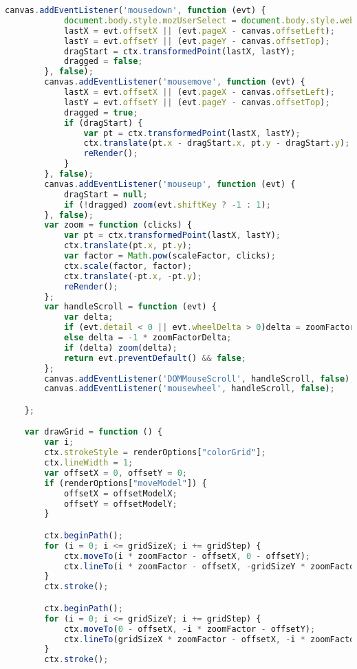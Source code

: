 \begin{lstlisting}[language=JavaScript, label={lst:renderFactory}, caption=When render frames are requested this file compiles the lines of gcode from the worker and sets up the rest of the canvas frames.]
        canvas.addEventListener('mousedown', function (evt) {
            document.body.style.mozUserSelect = document.body.style.webkitUserSelect = document.body.style.userSelect = 'none';
            lastX = evt.offsetX || (evt.pageX - canvas.offsetLeft);
            lastY = evt.offsetY || (evt.pageY - canvas.offsetTop);
            dragStart = ctx.transformedPoint(lastX, lastY);
            dragged = false;
        }, false);
        canvas.addEventListener('mousemove', function (evt) {
            lastX = evt.offsetX || (evt.pageX - canvas.offsetLeft);
            lastY = evt.offsetY || (evt.pageY - canvas.offsetTop);
            dragged = true;
            if (dragStart) {
                var pt = ctx.transformedPoint(lastX, lastY);
                ctx.translate(pt.x - dragStart.x, pt.y - dragStart.y);
                reRender();
            }
        }, false);
        canvas.addEventListener('mouseup', function (evt) {
            dragStart = null;
            if (!dragged) zoom(evt.shiftKey ? -1 : 1);
        }, false);
        var zoom = function (clicks) {
            var pt = ctx.transformedPoint(lastX, lastY);
            ctx.translate(pt.x, pt.y);
            var factor = Math.pow(scaleFactor, clicks);
            ctx.scale(factor, factor);
            ctx.translate(-pt.x, -pt.y);
            reRender();
        };
        var handleScroll = function (evt) {
            var delta;
            if (evt.detail < 0 || evt.wheelDelta > 0)delta = zoomFactorDelta;
            else delta = -1 * zoomFactorDelta;
            if (delta) zoom(delta);
            return evt.preventDefault() && false;
        };
        canvas.addEventListener('DOMMouseScroll', handleScroll, false);
        canvas.addEventListener('mousewheel', handleScroll, false);

    };

    var drawGrid = function () {
        var i;
        ctx.strokeStyle = renderOptions["colorGrid"];
        ctx.lineWidth = 1;
        var offsetX = 0, offsetY = 0;
        if (renderOptions["moveModel"]) {
            offsetX = offsetModelX;
            offsetY = offsetModelY;
        }

        ctx.beginPath();
        for (i = 0; i <= gridSizeX; i += gridStep) {
            ctx.moveTo(i * zoomFactor - offsetX, 0 - offsetY);
            ctx.lineTo(i * zoomFactor - offsetX, -gridSizeY * zoomFactor - offsetY);
        }
        ctx.stroke();

        ctx.beginPath();
        for (i = 0; i <= gridSizeY; i += gridStep) {
            ctx.moveTo(0 - offsetX, -i * zoomFactor - offsetY);
            ctx.lineTo(gridSizeX * zoomFactor - offsetX, -i * zoomFactor - offsetY);
        }
        ctx.stroke();


\end{lstlisting}
